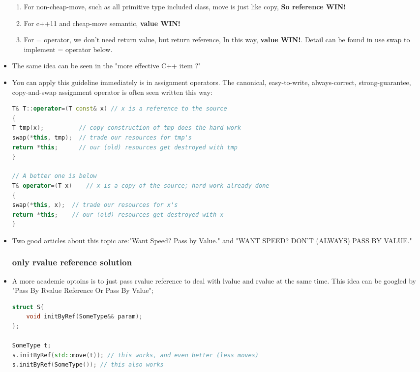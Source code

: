 \documentclass[a4paper,12pt,twoside]{book}
\begin{document}
\begin{itemize}
\begin{enumerate}
	\item For non-cheap-move, such as all primitive type included class, move is just like copy, \textbf{So reference WIN!}
	
	\item For c++11 and cheap-move semantic, \textbf{value WIN!}
	
	\item For = operator, we don't need return value, but return reference, In this way, \textbf{value WIN!}. Detail can be found in use swap to implement = operator below. 
	
\end{enumerate}


\item The same idea can be seen in the "more effective C++ item ?" 

\item You can apply this guideline immediately is in assignment operators. The canonical, easy-to-write, always-correct, strong-guarantee, copy-and-swap assignment operator is often seen written this way:
\begin{lstlisting}[frame=single, language=c++]
T& T::operator=(T const& x) // x is a reference to the source
{ 
T tmp(x);          // copy construction of tmp does the hard work
swap(*this, tmp);  // trade our resources for tmp's
return *this;      // our (old) resources get destroyed with tmp 
}

// A better one is below
T& operator=(T x)    // x is a copy of the source; hard work already done
{
swap(*this, x);  // trade our resources for x's
return *this;    // our (old) resources get destroyed with x
}
\end{lstlisting}

\item Two good articles about this topic are:"Want Speed? Pass by Value." and "WANT SPEED? DON’T (ALWAYS) PASS BY VALUE."

\subsubsection{only rvalue  reference solution}
\item A more academic optoins is to just pass rvalue  reference to deal with lvalue and rvalue at the same time. This idea can be googled by "Pass By Rvalue Reference Or Pass By Value";
\begin{lstlisting}[frame=single, language=c++]
struct S{
    void initByRef(SomeType&& param);
};

SomeType t;
s.initByRef(std::move(t)); // this works, and even better (less moves)
s.initByRef(SomeType()); // this also works
\end{lstlisting}


\end{itemize}
\end{document}
